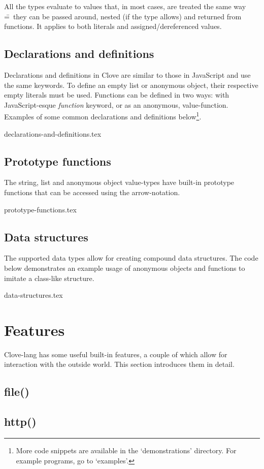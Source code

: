 \documentclass[12pt,a4paper]{article}
\begin{document}
All the types evaluate to values that, in most cases, are treated the same way \==~they can be passed around, nested (if the type allows) and returned from functions. It applies to both literals and assigned/dereferenced values.



\subsection*{Declarations and definitions}
Declarations and definitions in Clove are similar to those in JavaScript and use the same keywords. To define an empty list or anonymous object, their respective empty literals must be used. Functions can be defined in two ways: with JavaScript-esque \emph{function} keyword, or as an anonymous, value-function. Examples of some common declarations and definitions below\footnote{More code snippets are available in the `demonstrations' directory. For example programs, go to `examples'.}.

{declarations-and-definitions.tex}



\subsection*{Prototype functions}
The string, list and anonymous object value-types have built-in prototype functions that can be accessed using the arrow-notation.

{prototype-functions.tex}



\subsection*{Data structures}
The supported data types allow for creating compound data structures. The code below demonstrates an example usage of anonymous objects and functions to imitate a class-like structure.

{data-structures.tex}









\section*{Features}
Clove-lang has some useful built-in features, a couple of which allow for interaction with the outside world. This section introduces them in detail.


\subsection*{file()}


\subsection*{http()}
\end{document}
